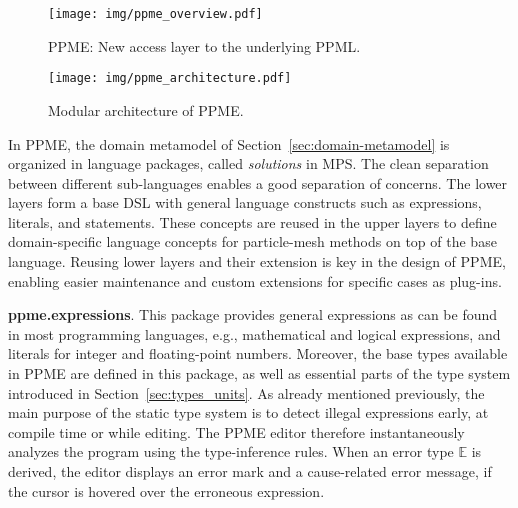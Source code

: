   \begin{figure}[tp]
    \begin{minipage}[b]{.57\textwidth}
      \centering
      \texttt{[image: img/ppme\_overview.pdf]}
      \caption{PPME: New access layer to the underlying PPML.}
      \label{fig:ppme-access_layer}
    \end{minipage}
    \hfill
    \begin{minipage}[b]{.40\textwidth}
      \centering
      \texttt{[image: img/ppme\_architecture.pdf]}
      \caption{Modular architecture of PPME.}
      \label{fig:ppme-architecture}
    \end{minipage}
  \end{figure}

In PPME, the domain metamodel of Section~\ref{sec:domain-metamodel}
is organized in language packages, called \emph{solutions} in MPS. The clean separation between
different sub-languages enables a good separation of concerns. The lower layers form a base DSL with
general language constructs such as expressions, literals, and statements. These concepts are reused in the upper
layers to define domain-specific language concepts for particle-mesh methods on top of the base language.
Reusing lower layers and their extension is key in the design of PPME, enabling easier
maintenance and custom extensions for specific cases as plug-ins. 


\textbf{ppme.expressions}.
This package provides general expressions as can be found in most programming languages, e.g., mathematical
and logical expressions, and literals for integer and floating-point numbers. Moreover, the base types available in
PPME are defined in this package, as well as essential parts of the type system introduced in Section~\ref{sec:types_units}.
%
As already mentioned previously, the main purpose of the static type system is to detect illegal expressions early,
at compile time or while editing. The PPME editor therefore instantaneously analyzes the program using the type-inference rules.
When an error type $\mathbb{E}$ is derived, the editor displays an error mark and a cause-related error message, if the
cursor is hovered over the erroneous expression. 

